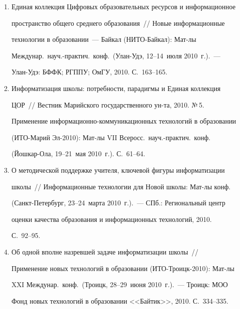 \begin{enumerate}[1.]
2010. С.~41--43.~--- URL: 


{\sf http://www.srcc.msu.su/uni-persona/site/conf/marginalii-2010/thesis.htm}.


\item {}


Единая коллекция Цифровых образовательных ресурсов и информационное 


пространство общего среднего образования~/\!\!/  Новые информационные 


технологии в образовании~--- Байкал (НИТО-Байкал): Мат-лы 


Междунар.\ науч.-практич.\ конф.\  (Улан-Удэ, 12--14~июля 2010~г.).~--- 


Улан-Удэ: БФФК; РГППУ; ОмГУ, 2010. С.~163--165.


\item {}


Информатизация школы: потребности, парадигмы и Единая коллекция 


ЦОР~/\!\!/  Вестник Марийского государственного ун-та, 2010. №\,5. 


Применение информационно-коммуникационных технологий в образовании 


(ИТО-Марий Эл-2010): Мат-лы VII Всеросс.\  науч.-практич.\ конф.\  


(Йошкар-Ола, 19--21~мая 2010~г.). С.~61--64.


\item {}


О методической поддержке учителя, ключевой фигуры информатизации 


школы~/\!\!/  Информационные технологии для Новой школы: Мат-лы конф.\ 


(Санкт-Пе\-тер\-бург, 23--24~марта 2010~г.).~--- СПб.: Региональный центр 


оценки качества образования и информационных технологий, 2010. 


С.~92--95.


\item {}


Об одной вполне назревшей задаче информатизации школы~/\!\!/  


Применение новых технологий в образовании (ИТО-Троицк-2010): Мат-лы 


XXI Междунар.\ конф.\ (Троицк, 28--29~июня 2010~г.).~--- Троицк: МОО 


Фонд новых технологий в образовании <<Байтик>>, 2010. С.~334--335.



\end{enumerate}

